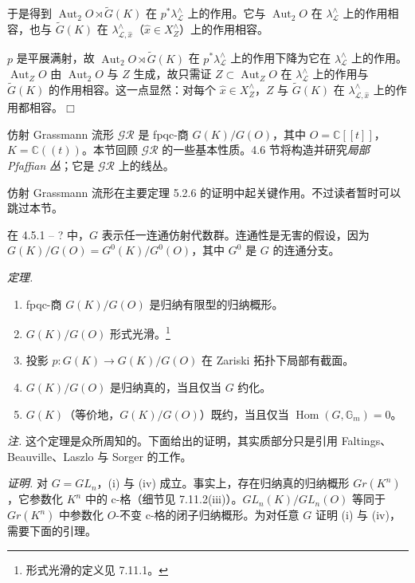 于是得到 $\operatorname{Aut}_2 O\rtimes\widetilde{G}(K)$ 在 $p^*\lambda^{\wedge}_{\mathcal{L}}$ 上的作用。它与 $\operatorname{Aut}_2 O$ 在 $\lambda^{\wedge}_{\mathcal{L}}$ 上的作用相容，也与 $\widetilde{G}(K)$ 在 $\lambda^{\wedge}_{\mathcal{L},\hat x}$（$\hat x\in X^{\wedge}_Z$）上的作用相容。

$p$ 是平展满射，故 $\operatorname{Aut}_2 O\rtimes\widetilde{G}(K)$ 在 $p^*\lambda^{\wedge}_{\mathcal{L}}$ 上的作用下降为它在 $\lambda^{\wedge}_{\mathcal{L}}$ 上的作用。$\operatorname{Aut}_Z O$ 由 $\operatorname{Aut}_2 O$ 与 $Z$ 生成，故只需证 $Z\subset\operatorname{Aut}_Z O$ 在 $\lambda^{\wedge}_{\mathcal{L}}$ 上的作用与 $\widetilde{G}(K)$ 的作用相容。这一点显然：对每个 $\hat x\in X^{\wedge}_Z$，$Z$ 与 $\widetilde{G}(K)$ 在 $\lambda^{\wedge}_{\mathcal{L},\hat x}$ 上的作用都相容。\hfill$\Box$


仿射 Grassmann 流形 $\mathcal{GR}$ 是 fpqc-商 $G(K)/G(O)$，其中 $O=\mathbb{C}[[t]]$，$K=\mathbb{C}((t))$。本节回顾 $\mathcal{GR}$ 的一些基本性质。4.6 节将构造并研究\emph{局部 Pfaffian 丛}；它是 $\mathcal{GR}$ 上的线丛。

仿射 Grassmann 流形在主要定理 5.2.6 的证明中起关键作用。不过读者暂时可以跳过本节。

在 4.5.1 – ? 中，$G$ 表示任一连通仿射代数群。连通性是无害的假设，因为 $G(K)/G(O)=G^0(K)/G^0(O)$，其中 $G^0$ 是 $G$ 的连通分支。

 \emph{定理.}
\begin{enumerate}[label=(\roman*),leftmargin=2.2em]
\item fpqc-商 $G(K)/G(O)$ 是归纳有限型的归纳概形。
\item $G(K)/G(O)$ 形式光滑。\footnote{形式光滑的定义见 7.11.1。}
\item 投影 $p:G(K)\to G(K)/G(O)$ 在 Zariski 拓扑下局部有截面。
\item $G(K)/G(O)$ 是归纳真的，当且仅当 $G$ 约化。
\item $G(K)$（等价地，$G(K)/G(O)$）既约，当且仅当 $\operatorname{Hom}(G,\mathbb{G}_m)=0$。
\end{enumerate}

\emph{注.} 这个定理是众所周知的。下面给出的证明，其实质部分只是引用 Faltings、Beauville、Laszlo 与 Sorger 的工作。

\emph{证明.} 对 $G=GL_n$，(i) 与 (iv) 成立。事实上，存在归纳真的归纳概形 $Gr(K^n)$，它参数化 $K^n$ 中的 c-格（细节见 7.11.2(iii)）。$GL_n(K)/GL_n(O)$ 等同于 $Gr(K^n)$ 中参数化 $O$-不变 c-格的闭子归纳概形。为对任意 $G$ 证明 (i) 与 (iv)，需要下面的引理。


